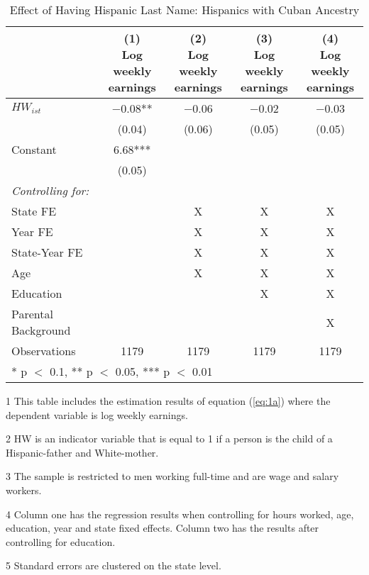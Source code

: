 \begin{table}[H]
\centering\centering
\caption{Effect of Having Hispanic Last Name: Hispanics with Cuban Ancestry  \label{tab:lastnamereg-weekearm-cub}}
\centering
\begin{threeparttable}
\begin{tabular}[t]{lcccc}
\toprule
  & \specialcell{(1) \\ Log weekly \\ earnings} & \specialcell{(2) \\ Log weekly \\ earnings} & \specialcell{(3) \\  Log weekly \\ earnings} & \specialcell{(4) \\  Log weekly \\ earnings}\\
\midrule
$HW_{ist}$ & \num{-0.08}** & \num{-0.06} & \num{-0.02} & \num{-0.03}\\
 & (\num{0.04}) & (\num{0.06}) & (\num{0.05}) & (\num{0.05})\\
Constant & \num{6.68}*** &  &  & \\
 & (\num{0.05}) &  &  & \\
\midrule
\textit{Controlling for:} &  &  &  & \\
State FE &  & X & X & X\\
Year FE &  & X & X & X\\
State-Year FE &  & X & X & X\\
Age &  & X & X & X\\
Education &  &  & X & X\\
Parental Background &  &  &  & X\\
Observations & \num{1179} & \num{1179} & \num{1179} & \num{1179}\\
\bottomrule
\multicolumn{5}{l}{\rule{0pt}{1em}* p $<$ 0.1, ** p $<$ 0.05, *** p $<$ 0.01}\\
\end{tabular}
\begin{tablenotes}
\item[1] {\footnotesize{This table includes the estimation results of equation (\ref{eq:1a}) where the dependent variable is log weekly earnings.}}
\item[2] {\footnotesize{HW is an indicator variable that is equal to 1 if a person is the child of a Hispanic-father and White-mother.}}
\item[3] {\footnotesize{The sample is restricted to men working full-time and are wage and salary workers.}}
\item[4] {\footnotesize{Column one has the regression results when controlling for hours worked, age, education, year and state fixed effects. Column two has the results after controlling for education.}}
\item[5] {\footnotesize{Standard errors are clustered on the state level.}}
\end{tablenotes}
\end{threeparttable}
\end{table}
